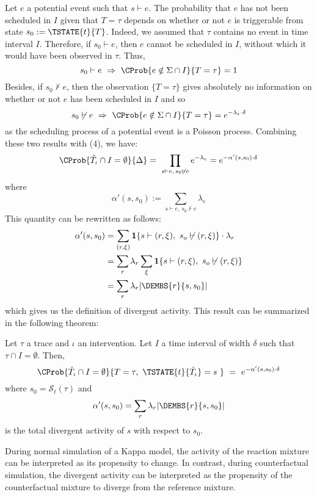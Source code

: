 Let $e$ a potential event such that $s \vdash e$. The probability
that $e$ has not been scheduled in $I$ given that $T=\tau$ depends on whether or not
$e$ is triggerable from state $s_0 := \TSTATE{t}{T}$. Indeed, we assumed that
$\tau$ contains no event in time interval $I$. Therefore, if $s_0 \vdash e$, then
$e$ cannot be scheduled in $I$, without which it would have been observed in $\tau$.
Thus, \[ s_0 \vdash e \ \Rightarrow\  \CProb{e \notin \Sigma \cap I}{ T=\tau } = 1  \]
Besides, if $s_0 \not\vdash e$, then the observation $\{ T=\tau \}$ gives absolutely
no information on whether or not $e$ has been scheduled in $I$ and so
\[ s_0 \not\vdash e \ \Rightarrow\  \CProb{e \notin \Sigma \cap I}{ T=\tau } 
= e^{-\lambda_e \cdot \delta}  \]
as the scheduling process of a potential event is a Poisson process. Combining these
two results with (4), we have:
\begin{align}
\CProb{ \hat T_\iota \cap I = \emptyset }{ \Delta }
=\ \prod_{s \vdash e, \, s_0 \not\vdash e} e^{-\lambda_e} = e^{-\alpha'(s, s_0)\cdot\delta}
\end{align}
where \[\alpha'(s, s_0) := \sum_{s \vdash e, \, s_0 \not\vdash e} \lambda_e \]
This quantity can be rewritten as follows:
\begin{align}
\alpha'(s, s_0) &= 
\sum_{(r, \xi)} \textbf{1}\{ s \vdash (r, \xi),\ s_o \not\vdash (r, \xi) \}\cdot\lambda_r \\
&= \sum_r \lambda_r\sum_\xi \textbf{1}\{ s \vdash (r, \xi),\ s_o \not\vdash (r, \xi) \} \\
&= \sum_r \lambda_r |\DEMBS{r}{s, s_0}|
\end{align}
which gives us the definition of divergent activity. This result can be summarized in
the following theorem:
\begin{theorem} Let $\tau$ a trace and $\iota$ an intervention. Let $I$ a time interval
of width $\delta$ such that $\tau \cap I = \emptyset$. Then,
\[\CProb{ \hat T_\iota \cap I = \emptyset }{ T=\tau,\ \TSTATE{t}{\hat T_\iota} = s\ }
\ =\ e^{-\alpha'(s, s_0) \cdot \delta}
\]
where $s_0 = \mathcal{S}_t(\tau)$ and
\[\alpha'(s, s_0) = \sum_r \lambda_r |\DEMBS{r}{s, s_0}| \]
is the total divergent activity of $s$ with respect to $s_0$.
\end{theorem}
During normal simulation of a Kappa model, the activity of the reaction mixture can 
be interpreted as its propensity to change. In contrast, during counterfactual
simulation, the divergent activity can be interpreted as the propensity of the counterfactual
mixture to diverge from the reference mixture.






